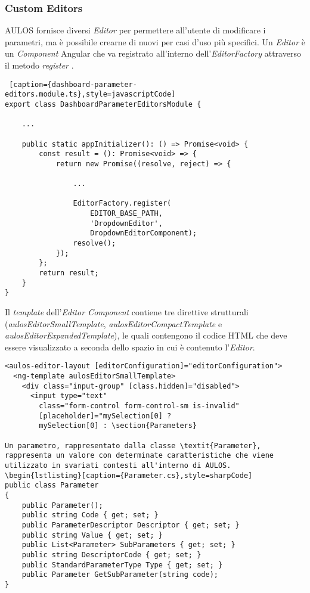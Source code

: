 \subsubsection{Custom Editors}
AULOS fornisce diversi \textit{Editor} per permettere all'utente di modificare i parametri, ma è possibile crearne di nuovi per casi d'uso più specifici. Un \textit{Editor} è un \textit{Component} Angular che va registrato all'interno dell'\textit{EditorFactory} attraverso il metodo \textit{register} .\\
\begin{lstlisting} [caption={dashboard-parameter-editors.module.ts},style=javascriptCode]
export class DashboardParameterEditorsModule {

    ...

    public static appInitializer(): () => Promise<void> {
        const result = (): Promise<void> => {
            return new Promise((resolve, reject) => {
            
                ...
                
                EditorFactory.register(
                    EDITOR_BASE_PATH,
                    'DropdownEditor',
                    DropdownEditorComponent);
                resolve();
            });
        };
        return result;
    }
}
\end{lstlisting}
Il \textit{template} dell'\textit{Editor Component} contiene tre direttive strutturali (\textit{aulosEditorSmallTemplate}, \textit{aulosEditorCompactTemplate} e \textit{aulosEditorExpandedTemplate}), le quali contengono il codice HTML che deve essere visualizzato a seconda dello spazio in cui è contenuto l'\textit{Editor}.
\begin{lstlisting}[caption={source-editor.component.html},style=html]
<aulos-editor-layout [editorConfiguration]="editorConfiguration">
  <ng-template aulosEditorSmallTemplate>
    <div class="input-group" [class.hidden]="disabled">
      <input type="text" 
        class="form-control form-control-sm is-invalid"
        [placeholder]="mySelection[0] ? 
        mySelection[0] : \section{Parameters}

Un parametro, rappresentato dalla classe \textit{Parameter}, rappresenta un valore con determinate caratteristiche che viene utilizzato in svariati contesti all'interno di AULOS.
\begin{lstlisting}[caption={Parameter.cs},style=sharpCode]
public class Parameter
{
    public Parameter();
    public string Code { get; set; }
    public ParameterDescriptor Descriptor { get; set; }
    public string Value { get; set; }
    public List<Parameter> SubParameters { get; set; }
    public string DescriptorCode { get; set; }
    public StandardParameterType Type { get; set; }
    public Parameter GetSubParameter(string code);
}
\end{lstlisting}
